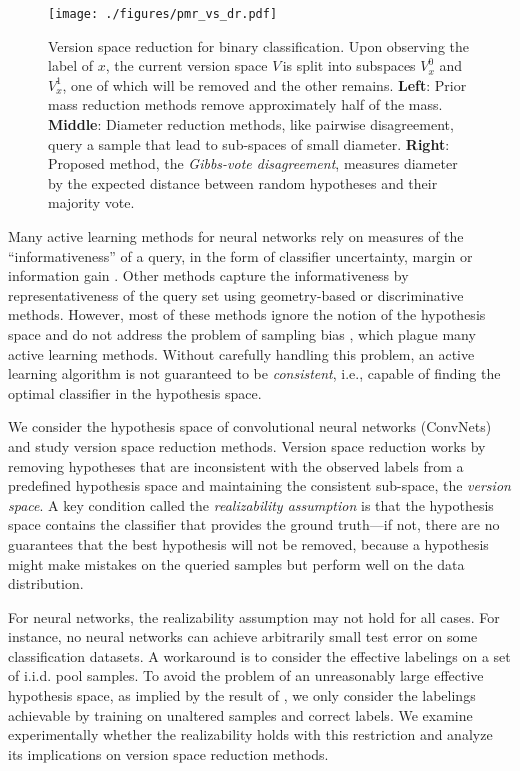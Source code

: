 \documentclass[runningheads, envcountsame, a4paper]{llncs}
\newcommand{\ie}{i.e.}
\begin{document}
\begin{figure}[h]
    \begin{center}
\texttt{[image: ./figures/pmr\_vs\_dr.pdf]}
    \end{center}
    \caption{Version space reduction for binary classification. Upon observing the label of $x$, the current version space $V\,$is split into subspaces $V_x^0$ and $V_x^1$, one of which will be removed and the other remains. \textbf{Left}: Prior mass reduction methods remove approximately half of the mass. \textbf{Middle}: Diameter reduction methods, like pairwise disagreement, query a sample that lead to sub-spaces of small diameter. \textbf{Right}: Proposed method, the \textit{Gibbs-vote disagreement}, measures diameter by the expected distance between random hypotheses and their majority vote.}
    \label{fig:pmr_vs_dr}
\end{figure}

Many active learning methods for neural networks rely on measures of the ``informativeness'' of a query, in the form of classifier uncertainty, margin \cite{Joshi09,Ducoffe18} or information gain \cite{Houlsby11,Gal17,Kirsch19}. Other methods capture the informativeness by representativeness of the query set using geometry-based \cite{Sener18} or discriminative \cite{Gissin19} methods. However, most of these methods ignore the notion of the hypothesis space and do not address the problem of sampling bias \cite{Dasgupta09}, which plague many active learning methods. Without carefully handling this problem, an active learning algorithm is not guaranteed to be \textit{consistent}, \ie, capable of finding the optimal classifier in the hypothesis space. 

We consider the hypothesis space of convolutional neural networks (ConvNets) and study version space reduction methods. 
Version space reduction works by removing hypotheses that are inconsistent with the observed labels from a predefined hypothesis space and maintaining the consistent sub-space, the \textit{version space}. A key condition called the \textit{realizability assumption} is that the hypothesis space contains the classifier that provides the ground truth---if not, there are no guarantees that the best hypothesis will not be removed, because a hypothesis might make mistakes on the queried samples but perform well on the data distribution. 

For neural networks, the realizability assumption may not hold for all cases. For instance, no neural networks can achieve arbitrarily small test error on some classification datasets. A workaround is to consider the effective labelings on a set of i.i.d. pool samples. To avoid the problem of an unreasonably large effective hypothesis space, as implied by the result of \cite{Zhang16}, we only consider the labelings achievable by training on unaltered samples and correct labels. 
We examine experimentally whether the realizability holds with this restriction and analyze its implications on version space reduction methods.
\end{document}
